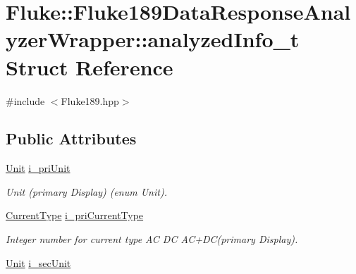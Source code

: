 \hypertarget{structFluke_1_1Fluke189DataResponseAnalyzerWrapper_1_1analyzedInfo__t}{
\section{Fluke::Fluke189DataResponseAnalyzerWrapper::analyzedInfo\_\-t Struct Reference}
\label{structFluke_1_1Fluke189DataResponseAnalyzerWrapper_1_1analyzedInfo__t}
}


{\ttfamily \#include $<$Fluke189.hpp$>$}\subsection*{Public Attributes}
\begin{DoxyCompactItemize}
\item 
\hypertarget{structFluke_1_1Fluke189DataResponseAnalyzerWrapper_1_1analyzedInfo__t_aba8eba7b53ed6345bdcbfb9bebfe4e61}{
\hyperlink{classFluke_1_1Fluke189DataResponseAnalyzerWrapper_ab8e5f2306e4d2ad3d741d273793aaed1}{Unit} \hyperlink{structFluke_1_1Fluke189DataResponseAnalyzerWrapper_1_1analyzedInfo__t_aba8eba7b53ed6345bdcbfb9bebfe4e61}{i\_\-priUnit}}
\label{structFluke_1_1Fluke189DataResponseAnalyzerWrapper_1_1analyzedInfo__t_aba8eba7b53ed6345bdcbfb9bebfe4e61}

\begin{DoxyCompactList}\small\item\em Unit (primary Display) (enum Unit). \item\end{DoxyCompactList}\item 
\hypertarget{structFluke_1_1Fluke189DataResponseAnalyzerWrapper_1_1analyzedInfo__t_aac9913e9a3b6cca77d9b339f5090493c}{
\hyperlink{classFluke_1_1Fluke189DataResponseAnalyzerWrapper_afef24496da239e3613c40ad3582d7adc}{CurrentType} \hyperlink{structFluke_1_1Fluke189DataResponseAnalyzerWrapper_1_1analyzedInfo__t_aac9913e9a3b6cca77d9b339f5090493c}{i\_\-priCurrentType}}
\label{structFluke_1_1Fluke189DataResponseAnalyzerWrapper_1_1analyzedInfo__t_aac9913e9a3b6cca77d9b339f5090493c}

\begin{DoxyCompactList}\small\item\em Integer number for current type AC DC AC+DC(primary Display). \item\end{DoxyCompactList}\item 
\hypertarget{structFluke_1_1Fluke189DataResponseAnalyzerWrapper_1_1analyzedInfo__t_a440be0601e12d6fed6da867404e01b4d}{
\hyperlink{classFluke_1_1Fluke189DataResponseAnalyzerWrapper_ab8e5f2306e4d2ad3d741d273793aaed1}{Unit} \hyperlink{structFluke_1_1Fluke189DataResponseAnalyzerWrapper_1_1analyzedInfo__t_a440be0601e12d6fed6da867404e01b4d}{i\_\-secUnit}}
\label{structFluke_1_1Fluke189DataResponseAnalyzerWrapper_1_1analyzedInfo__t_a440be0601e12d6fed6da867404e01b4d}


\end{DoxyCompactItemize}
